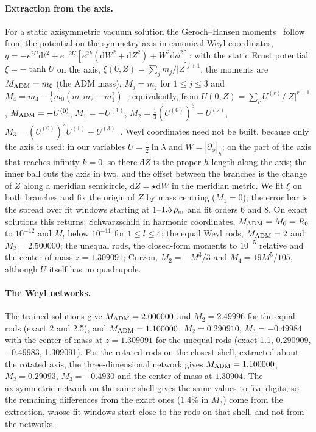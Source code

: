 \documentclass[aps,prd,twocolumn,superscriptaddress, nofootinbib,floatfix]{revtex4-2}
\newcommand{\dd}{\mathrm{d}}
\begin{document}
\paragraph{Extraction from the axis.} For a static axisymmetric vacuum solution the Geroch--Hansen moments~\cite{Geroch1970,Hansen1974,Beig2000} follow from the potential on the symmetry axis in canonical Weyl coordinates, $g = -e^{2U}\dd t^2+e^{-2U}[e^{2k}(\dd W^2+\dd Z^2)+W^2\dd\phi^2]$: with the static Ernst potential $\xi = -\tanh U$ on the axis, $\xi(0,Z) = \sum_j m_j/|Z|^{j+1}$, the moments are $M_{\rm ADM}=m_0$ (the ADM mass), $M_j = m_j$ for $1\le j\le3$ and $M_4 = m_4 - \tfrac17 m_0(m_0m_2-m_1^2)$~\cite{SotiriouApostolatos2004}; equivalently, from $U(0,Z) = \sum_r U^{(r)}/|Z|^{r+1}$, $M_{\rm ADM}=-U^{(0)}$, $M_1=-U^{(1)}$, $M_2 = \tfrac13(U^{(0)})^3-U^{(2)}$, $M_3=(U^{(0)})^2U^{(1)}-U^{(3)}$~\cite{FHP1989}.
Weyl coordinates need not be built, because only the axis is used: in our variables $U = \tfrac12\ln\lambda$ and $W = |\partial_\phi|_h$; on the part of the axis that reaches infinity $k=0$, so there $\dd Z$ is the proper $h$-length along the axis; the inner ball cuts the axis in two, and the offset between the branches is the change of $Z$ along a meridian semicircle, $\dd Z = \star\dd W$ in the meridian metric.
We fit $\xi$ on both branches and fix the origin of $Z$ by mass centring ($M_1=0$); the error bar is the spread over fit windows starting at $1$--$1.5\,\rho_{\rm in}$ and fit orders 6 and 8.
On exact solutions this returns: Schwarzschild in harmonic coordinates, $M_{\rm ADM}=M_0=R_0$ to $10^{-12}$ and $M_l$ below $10^{-11}$ for $1\le l\le4$; the equal Weyl rods, $M_{\rm ADM} = 2$ and $M_2 = 2.500000$; the unequal rods, the closed-form moments to $10^{-5}$ relative and the center of mass $z=1.309091$; Curzon, $M_2 = -M^3/3$ and $M_4 = 19M^5/105$, although $U$ itself has no quadrupole.

\paragraph{The Weyl networks.} The trained solutions give $M_{\rm ADM} = 2.000000$ and $M_2 = 2.49996$ for the equal rods (exact 2 and 2.5), and $M_{\rm ADM} = 1.100000$, $M_2 = 0.290910$, $M_3 = -0.49984$ with the center of mass at $z = 1.309091$ for the unequal rods (exact 1.1, 0.290909, $-0.49983$, 1.309091).
For the rotated rods on the closest shell, extracted about the rotated axis, the three-dimensional network gives $M_{\rm ADM} = 1.100000$, $M_2 = 0.29093$, $M_3 = -0.4930$ and the center of mass at $1.30904$.
The axisymmetric network on the same shell gives the same values to five digits, so the remaining differences from the exact ones (1.4\% in $M_3$) come from the extraction, whose fit windows start close to the rods on that shell, and not from the networks.
\end{document}
